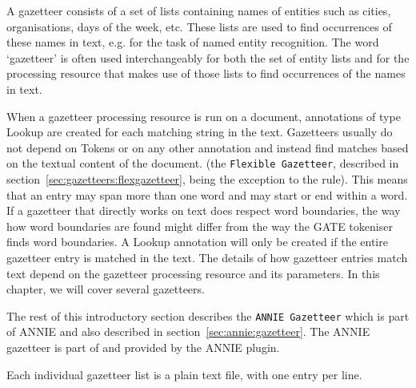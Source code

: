 %
%
%
%

A gazetteer consists of a set of lists containing names of entities such as
cities, organisations, days of the week, etc. These lists are used to
find occurrences of these names in text, e.g. for the 
task of named entity recognition.  
The word `gazetteer' is often used interchangeably for both the set of 
entity lists and for the processing resource that makes use of those
lists to find occurrences of the names in text.

When a gazetteer processing resource is run on a document, annotations of type Lookup
are created for each matching string in the text. Gazetteers usually do not
depend on Tokens or on any other annotation and instead find matches based
on the textual content of the document.
(the \texttt{Flexible Gazetteer}, described in section~\ref{sec:gazetteers:flexgazetteer},
 being the exception to the rule). 
This means that an entry may span
more than one word and may start or end within a word. If a gazetteer that
directly works on text does
respect word boundaries, the way how word boundaries are found might differ
from the way the GATE tokeniser finds word boundaries.
A Lookup annotation will only be created if the entire gazetteer entry
is matched in the text. The details of how gazetteer
entries match text depend on the gazetteer processing resource and its 
parameters. In this chapter, we will cover several gazetteers.


The rest of this introductory section describes the 
\texttt{ANNIE Gazetteer} which is part of ANNIE and also described 
in section~\ref{sec:annie:gazetteer}. The ANNIE gazetteer is part of and provided
by the ANNIE plugin.


Each individual gazetteer list is a plain text file, with one entry per line. 

